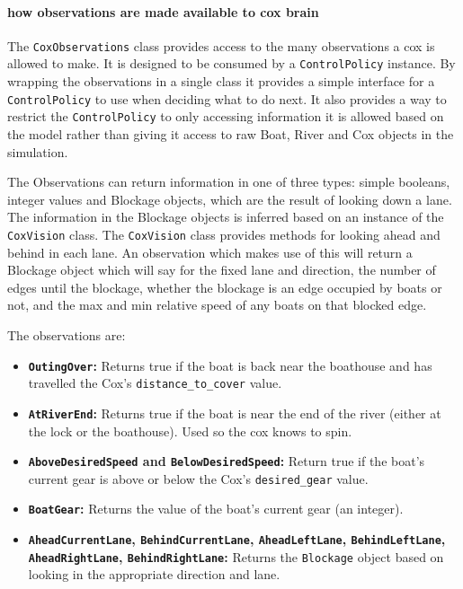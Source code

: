\paragraph{how observations are made available to cox brain}
The \texttt{CoxObservations} class provides access to the many observations a cox is allowed to make. It is designed to be consumed by a \texttt{ControlPolicy} instance. By wrapping the observations in a single class it provides a simple interface for a \texttt{ControlPolicy} to use when deciding what to do next. It also provides a way to restrict the \texttt{ControlPolicy} to only accessing information it is allowed based on the model rather than giving it access to raw Boat, River and Cox objects in the simulation.

The Observations can return information in one of three types: simple booleans, integer values and Blockage objects, which are the result of looking down a lane. The information in the Blockage objects is inferred based on an instance of the \texttt{CoxVision} class. The \texttt{CoxVision} class provides methods for looking ahead and behind in each lane. An observation which makes use of this will return a Blockage object which will say for the fixed lane and direction, the number of edges until the blockage, whether the blockage is an edge occupied by boats or not, and the max and min relative speed of any boats on that blocked edge.

The observations are:
  \begin{itemize}
    \item{\textbf{\texttt{OutingOver}:}} Returns true if the boat is back near the boathouse and has travelled the Cox's \texttt{distance\_to\_cover} value.
    \item{\textbf{\texttt{AtRiverEnd}:}} Returns true if the boat is near the end of the river (either at the lock or the boathouse). Used so the cox knows to spin.
    \item{\textbf{\texttt{AboveDesiredSpeed} and \texttt{BelowDesiredSpeed}:}} Return true if the boat's current gear is above or below the Cox's \texttt{desired\_gear} value. 
    \item{\textbf{\texttt{BoatGear}:}} Returns the value of the boat's current gear (an integer).
    \item{\textbf{\texttt{AheadCurrentLane}, \texttt{BehindCurrentLane}, \texttt{AheadLeftLane}, \texttt{BehindLeftLane}, \texttt{AheadRightLane}, \texttt{BehindRightLane}:}} Returns the \texttt{Blockage} object based on looking in the appropriate direction and lane.
  \end{itemize}
  
